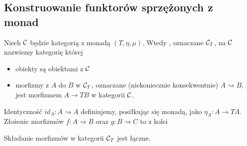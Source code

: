 \subsection{Konstruowanie funktorów sprzężonych z monad}
\begin{definition}{}{}
  Niech $\mathcal{C}$ będzie kategorią z monadą $(T, \eta, \mu)$. Wtedy , oznaczane $\mathcal{C}_T$, na $\mathcal{C}$ nazwiemy kategorię której
  \begin{itemize}
    \item obiekty są obiektami z $\mathcal{C}$ 
    \item morfizmy z $A$ do $B$ w $\mathcal{C}_T$, oznaczane (niekoniecznie konsekwentnie) $A\rightsquigarrow B$, jest morfizmem $A\to TB$ w kategorii $\mathcal{C}$.
  \end{itemize}
  Identyczność $id_A:A\rightsquigarrow A$ definiujemy, posiłkując się monadą, jako $\eta_A:A\to TA$. Złożenie morfizmów $f:A\rightsquigarrow B$ oraz $g:B\rightsquigarrow C$ to z kolei
  \begin{center}
  \end{center}
\end{definition}

\begin{lemma}{}{}
  Składanie morfizmów w kategorii $\mathcal{C}_T$ jest łączne.
\end{lemma}

